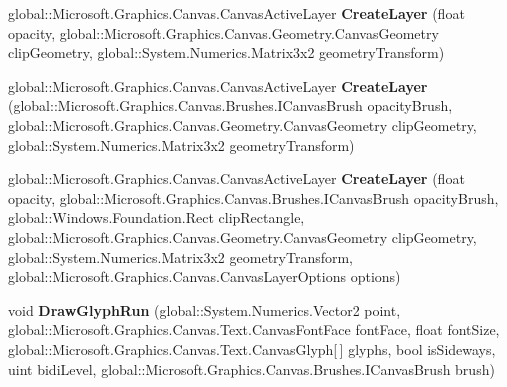 \begin{DoxyCompactItemize}
global\+::\+Microsoft.\+Graphics.\+Canvas.\+Canvas\+Active\+Layer {\bfseries Create\+Layer} (float opacity, global\+::\+Microsoft.\+Graphics.\+Canvas.\+Geometry.\+Canvas\+Geometry clip\+Geometry, global\+::\+System.\+Numerics.\+Matrix3x2 geometry\+Transform)
\item 
\mbox{\label{interface_microsoft_1_1_graphics_1_1_canvas_1_1_i_canvas_drawing_session_a4495a3f1a04a5602f8c32b065c311d4d}} 
global\+::\+Microsoft.\+Graphics.\+Canvas.\+Canvas\+Active\+Layer {\bfseries Create\+Layer} (global\+::\+Microsoft.\+Graphics.\+Canvas.\+Brushes.\+I\+Canvas\+Brush opacity\+Brush, global\+::\+Microsoft.\+Graphics.\+Canvas.\+Geometry.\+Canvas\+Geometry clip\+Geometry, global\+::\+System.\+Numerics.\+Matrix3x2 geometry\+Transform)
\item 
\mbox{\label{interface_microsoft_1_1_graphics_1_1_canvas_1_1_i_canvas_drawing_session_a885c860f277d273712a3171ad33885b8}} 
global\+::\+Microsoft.\+Graphics.\+Canvas.\+Canvas\+Active\+Layer {\bfseries Create\+Layer} (float opacity, global\+::\+Microsoft.\+Graphics.\+Canvas.\+Brushes.\+I\+Canvas\+Brush opacity\+Brush, global\+::\+Windows.\+Foundation.\+Rect clip\+Rectangle, global\+::\+Microsoft.\+Graphics.\+Canvas.\+Geometry.\+Canvas\+Geometry clip\+Geometry, global\+::\+System.\+Numerics.\+Matrix3x2 geometry\+Transform, global\+::\+Microsoft.\+Graphics.\+Canvas.\+Canvas\+Layer\+Options options)
\item 
\mbox{\label{interface_microsoft_1_1_graphics_1_1_canvas_1_1_i_canvas_drawing_session_a61dd68b679424c00d8f797822aa12eac}} 
void {\bfseries Draw\+Glyph\+Run} (global\+::\+System.\+Numerics.\+Vector2 point, global\+::\+Microsoft.\+Graphics.\+Canvas.\+Text.\+Canvas\+Font\+Face font\+Face, float font\+Size, global\+::\+Microsoft.\+Graphics.\+Canvas.\+Text.\+Canvas\+Glyph\mbox{[}$\,$\mbox{]} glyphs, bool is\+Sideways, uint bidi\+Level, global\+::\+Microsoft.\+Graphics.\+Canvas.\+Brushes.\+I\+Canvas\+Brush brush)
\item 
\mbox{\label{interface_microsoft_1_1_graphics_1_1_canvas_1_1_i_canvas_drawing_session_a5f67ddb4076cee52f0ce105ac7ff3625}} 

\end{DoxyCompactItemize}
